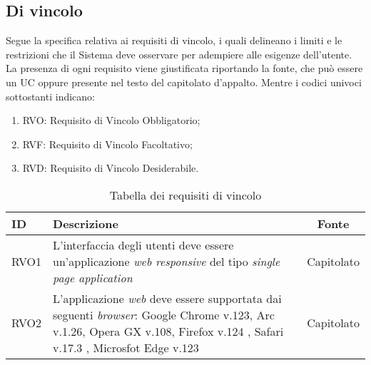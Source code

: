 \subsection{Di vincolo}

Segue la specifica relativa ai requisiti di vincolo, i quali delineano i limiti e le restrizioni che il Sistema deve osservare per adempiere alle esigenze dell'utente.
La presenza di ogni requisito viene giustificata riportando la fonte, che può essere un UC oppure presente
nel testo del capitolato d'appalto. Mentre i codici univoci sottostanti indicano:
\begin{enumerate}
	\item RVO: Requisito di Vincolo Obbligatorio;
	\item RVF: Requisito di Vincolo Facoltativo;
	\item RVD: Requisito di Vincolo Desiderabile.
\end{enumerate}

\begin{table}[H]
	\renewcommand{\arraystretch}{1.5}
	\centering
	\begin{tabularx}{\textwidth}{l|X|c}
		\textbf{ID} & \textbf{Descrizione}                                                                                                     & \textbf{Fonte} \\
		\hline
		RVO1        & L'interfaccia degli utenti deve essere un'applicazione \textit{web responsive} del tipo \textit{single page application} & Capitolato     \\
		\hline
		RVO2        & L'applicazione \textit{web} deve essere supportata dai seguenti \textit{browser}: Google Chrome v.123, Arc v.1.26, Opera GX v.108, Firefox v.124 , Safari v.17.3 , Microsfot Edge v.123  & Capitolato     \\
		\hline
	\end{tabularx}
	\caption{Tabella dei requisiti di vincolo}
\end{table}
